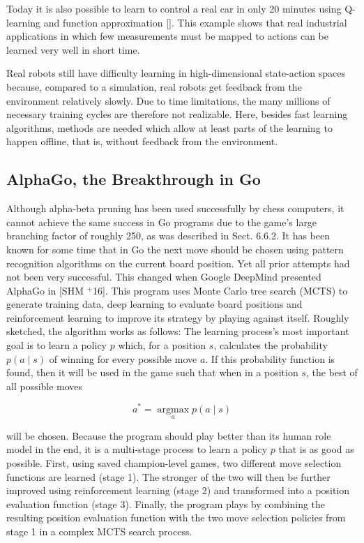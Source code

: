 \documentclass[10pt]{book}
\begin{document}
Today it is also possible to learn to control a real car in only 20 minutes using Q-learning and function approximation [\cite{riedmiller2007drive}]. This example shows that real industrial applications in which few measurements must be mapped to actions can be learned very well in short time.

Real robots still have difficulty learning in high-dimensional state-action spaces because, compared to a simulation, real robots get feedback from the environment relatively slowly. Due to time limitations, the many millions of necessary training cycles are therefore not realizable. Here, besides fast learning algorithms, methods are needed which allow at least parts of the learning to happen offline, that is, without feedback from the environment.

\subsection{AlphaGo, the Breakthrough in Go}
Although alpha-beta pruning has been used successfully by chess computers, it cannot achieve the same success in Go programs due to the game's large branching factor of roughly 250, as was described in Sect. 6.6.2. It has been known for some time that in Go the next move should be chosen using pattern recognition algorithms on the current board position. Yet all prior attempts had not been very successful. This changed when Google DeepMind presented AlphaGo in [SHM ${}^{+}$16]. This program uses Monte Carlo tree search (MCTS) to generate training data, deep learning to evaluate board positions and reinforcement learning to improve its strategy by playing against itself. Roughly sketched, the algorithm works as follows:
The learning process's most important goal is to learn a policy $p$ which, for a position $s$, calculates the probability $p(a \mid s)$ of winning for every possible move $a$. If this probability function is found, then it will be used in the game such that when in a position $s$, the best of all possible moves

$$
a^{*}=\underset{a}{\operatorname{argmax}} p(a \mid s)
$$

will be chosen. Because the program should play better than its human role model in the end, it is a multi-stage process to learn a policy $p$ that is as good as possible. First, using saved champion-level games, two different move selection functions are learned (stage 1). The stronger of the two will then be further improved using reinforcement learning (stage 2) and transformed into a position evaluation function (stage 3). Finally, the program plays by combining the resulting position evaluation function with the two move selection policies from stage 1 in a complex MCTS search process.
\end{document}
